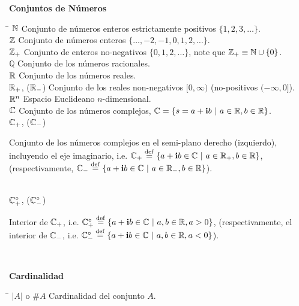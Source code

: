 \documentclass[11pt,letterpaper,twoside]{report}%
\begin{document}
{\bf Conjuntos de Números}
\begin{tabbing}
\hspace{\hdiml} \= \hspace{\hdim} \kill
$\mathbb{N}$  \> Conjunto de números enteros estrictamente positivos 
               $\{1,2,3,\ldots\}$.\\[\lsk] %
$\mathbb{Z}$  \> %
Conjunto de números enteros $\{\ldots,-2,-1,0,1,2,\ldots\}$.\\[\lsk]
$\mathbb{Z}_+$\> Conjunto de enteros no-negativos $\{0,1,2,\ldots\}$, 
               note que $\mathbb{Z}_+\equiv \mathbb{N}\cup\{0\}$.\\[\lsk] %
$\mathbb{Q}$\> Conjunto de los números racionales.\\[\lsk]
$\mathbb{R}$    \> %
               Conjunto de los números reales.\\[\lsk] %
$\mathbb{R}_+$, ($\mathbb{R}_-$) \> Conjunto de los reales non-negativos $[0,\infty)$  
                            (no-positivos $(-\infty,0]$).\\[\lsk] %
$\mathbb{R}^n$  \> Espacio Euclideano  $n$-dimensional.\\[\lsk] %
$\mathbb{C}$  \> %
               Conjunto de los números complejos, $\complex = \{s=a+\imnum b\ |\ a\in\reals, b\in\reals\}$.\\[\lsk]
$\mathbb{C}_+$, ($\mathbb{C}_-$) \> 
             \parbox[t]{\hdim}{
             Conjunto de los números complejos en el semi-plano derecho (izquierdo),
             incluyendo el eje imaginario, i.e. 
           $\mathbb{C}_+\stackrel{\rm def}{=} \{a+\mathbf{i} b\in\mathbb{C}~|~a\in\mathbb{R}_+, b\in\mathbb{R}\}$, 
           (respectivamente, $\mathbb{C}_-\stackrel{\rm def}{=} \{a+\mathbf{i} b\in\mathbb{C}~|~a\in\mathbb{R}_-, b\in\mathbb{R}\}$).
						}\\[\lsk] %
$\mathbb{C}_+^\circ$, ($\mathbb{C}_-^\circ$) \>
           \parbox[t]{\hdim}{
           Interior de $\mathbb{C}_+$, i.e. 
           $\mathbb{C}_+^\circ\stackrel{\rm def}{=} \{a+\mathbf{i} b\in\mathbb{C}~|~a,b\in\mathbb{R}, a>0 \}$, 
           (respectivamente, el interior de $\mathbb{C}_-$, i.e. $\mathbb{C}_-^\circ\stackrel{\rm def}{=} \{a+\mathbf{i} b\in\mathbb{C}~|~a,b\in\mathbb{R}, a<0 \}$).}\\[\lsk] %

\end{tabbing}

{\bf Cardinalidad}
\begin{tabbing}
\hspace{\hdiml} \= \hspace{\hdim} \kill
$|A|$ o $\#A$  \> Cardinalidad del conjunto $A$.\\[\lsk]
\end{tabbing}
\end{document}
